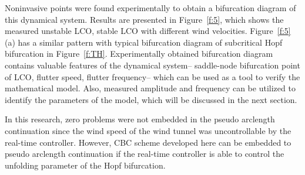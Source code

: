 \documentclass[openacc]{rsproca_new}%
\newcommand{\Fref}[1]{Figure~\ref{#1}}
\begin{document}
Noninvasive points were found experimentally to obtain a bifurcation diagram of this dynamical system. Results are presented in \Fref{f:5}, which shows the measured unstable LCO, stable LCO with different wind velocities. \Fref{f:5} (a) has a similar pattern with typical bifurcation diagram of subcritical Hopf bifurcation in \Fref{f:TH}. Experimentally obtained bifurcation diagram contains valuable features of the dynamical system-- saddle-node bifurcation point of LCO, flutter speed, flutter frequency-- which can be used as a tool to verify the mathematical model. Also, measured amplitude and frequency can be utilized to identify the parameters of the model, which will be discussed in the next section.

In this research, zero problems were not embedded in the pseudo arclength continuation since the wind speed of the wind tunnel was uncontrollable by the real-time controller. However, CBC scheme developed here can be embedded to pseudo arclength continuation if the real-time controller is able to control the unfolding parameter of the Hopf bifurcation.
\end{document}

